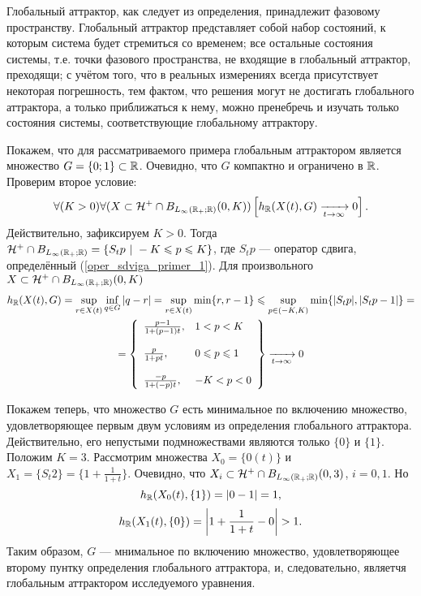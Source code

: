 Глобальный аттрактор, как следует из определения, принадлежит фазовому пространству.
Глобальный аттрактор представляет собой набор состояний, к которым система будет стремиться со временем;
все остальные состояния системы, т.е. точки фазового пространства, не входящие в глобальный аттрактор, преходящи;
с учётом того, что в реальных измерениях всегда присутствует некоторая погрешность, тем фактом, что решения могут не достигать глобального аттрактора, а только приближаться к нему, можно пренебречь и изучать только состояния системы, соответствующие глобальному аттрактору.

Покажем, что для рассматриваемого примера глобальным аттрактором является множество $G=\{0; 1\} \subset \mathbb{R}$.
Очевидно, что $G$ компактно и ограничено в $\mathbb{R}$.
Проверим второе условие:
$$
	\forall(K>0)\forall(X \subset \mathcal{H}^+ \cap B_{L_{\infty}\left( \mathbb{R}_+; \mathbb{R} \right)}(0,K))
		\left[
			h_{\mathbb{R}}(X(t),G) \xrightarrow[t\to \infty]{}{0}
		\right].
$$
Действительно, зафиксируем $K>0$.
Тогда $\mathcal{H}^+ \cap B_{L_{\infty}\left( \mathbb{R}_+; \mathbb{R} \right)} = \{ S_t p ~|~ -K \leqslant p \leqslant K\} $,
где $S_t p$ --- оператор сдвига, определённый (\ref{oper_sdviga_primer_1}).
Для произвольного $X \subset \mathcal{H}^+ \cap B_{L_{\infty}\left( \mathbb{R}_+; \mathbb{R} \right)}(0,K)$
\begin{multline*}
	h_{\mathbb{R}}(X(t),G) =
	\sup_{r\in X(t)} \inf_{q \in G} | q - r | =
	\sup_{r\in X(t)} \min\{r, r - 1\} \leqslant
	\sup_{p\in (-K, K)} \min\{|S_t p|, |S_t p - 1|\} =
	\\ =
	\left\{
		\begin{array}{ll}
			\frac{p - 1}{1 + (p-1)t},    & 1 < p < K
		\\\\
			\frac{p}{1 + pt},            & 0 \leqslant p \leqslant 1
		\\\\
			\frac{-p}{1 + (-p)t},        & -K < p < 0
		\end{array}
	\right\} \xrightarrow[t\to \infty]{}{0}
\end{multline*}

Покажем теперь, что множество $G$ есть минимальное по включению множество,
удовлетворяющее первым двум условиям из определения глобального аттрактора.
Действительно, его непустыми подмножествами являются только $\{0\}$ и $\{1\}$.
Положим $K=3$.
Рассмотрим множества $X_0 = \{0(t)\}$ и $X_1 = \{S_t 2\} = \{ 1+\frac{1}{1+t} \}$.
Очевидно, что $X_i \subset \mathcal{H}^+ \cap B_{L_{\infty}\left( \mathbb{R}_+; \mathbb{R} \right)}(0,3)$, $i=0,1$.
Но
$$
h_{\mathbb{R}}(X_0(t),\{1\}) = |0 - 1| = 1,
$$
$$
h_{\mathbb{R}}(X_1(t),\{0\}) = \left|1+\frac{1}{1+t} - 0\right| > 1.
$$
Таким образом, $G$ --- мнимальное по включению множество, удовлетворяющее второму пунтку определения глобального аттрактора,
и, следовательно, являетчя глобальным аттрактором исследуемого уравнения.

